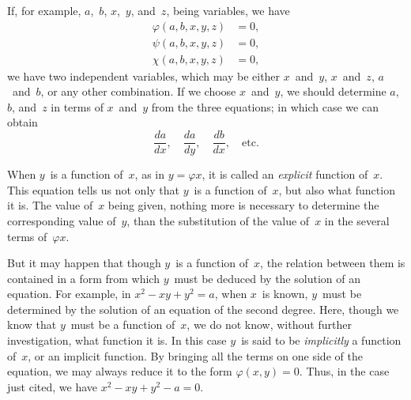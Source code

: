\documentclass[12pt]{book}[2005/09/16]
\newcommand{\Pagelabel}[1]{\phantomsection\label{page:#1}}
\newcommand{\PageSep}[1]{\Pagelabel{#1}\ignorespaces}
\renewcommand{\etc}{\text{etc}}
\renewcommand{\(}{{\upshape(}}
\renewcommand{\)}{{\upshape)}}
\renewcommand{\phi}{\varphi}
\begin{document}
If, for example, $a$,~$b$, $x$,~$y$, and~$z$, being variables,
we have
\begin{align*}
\phi(a, b, x, y, z) &= 0, \\
\psi(a, b, x, y, z) &= 0, \\
\chi(a, b, x, y, z) &= 0,
\end{align*}
we have two independent variables, which may be
either $x$~and~$y$, $x$~and~$z$, $a$~and~$b$, or any other combination.
If we choose $x$~and~$y$, we should determine
$a$,~$b$, and~$z$ in terms of $x$~and~$y$ from the three equations;
in which case we can obtain
\[
\frac{da}{dx},\quad \frac{da}{dy},\quad \frac{db}{dx},\quad \etc.
\]

When $y$~is a function of~$x$, as in $y = \phi x$, it is called
%
%
an \emph{explicit} function of~$x$. This equation tells us not
only that $y$~is a function of~$x$, but also what function
it is. The value of~$x$ being given, nothing more is
necessary to determine the corresponding value of~$y$,
than the substitution of the value of~$x$ in the several
terms of~$\phi x$.

But it may happen that though $y$~is a function of~$x$,
%
the relation between them is contained in a form
from which $y$~must be deduced by the solution of an
equation. For example, in $x^{2} - xy + y^{2} = a$, when $x$~is
known, $y$~must be determined by the solution of an
equation of the second degree. Here, though we know
that $y$~must be a function of~$x$, we do not know, without
further investigation, what function it is. In this
case $y$~is said to be \emph{implicitly} a function of~$x$, or an implicit
\PageSep{108}
function. By bringing all the terms on one side
of the equation, we may always reduce it to the form
$\phi(x, y) = 0$. Thus, in the case just cited, we have
$x^{2} - xy + y^{2} - a = 0$.
\end{document}
